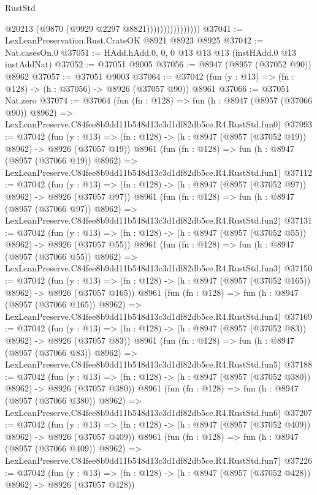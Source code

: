 \begin{lexlean}{RustStd}
\begin{coremodule}
                                @20213
                                (@9870 (@9929 @2297 @8821))))))))))))))))
@37041 := LexLeanPreservation.Rust.CrateOK @8921 @8923 @8925
@37042 := Nat.casesOn.{0}
@37051 := HAdd.hAdd.{0, 0, 0} @13 @13 @13 (instHAdd.{0} @13 instAddNat)
@37052 := @37051 @9005
@37056 := @8947 (@8957 (@37052 @90)) @8962
@37057 := @37051 @9003
@37064 := @37042 (fun (y : @13) => (fn : @128) -> (h : @37056) -> @8926 (@37057 @90)) @8961
@37066 := @37051 Nat.zero
@37074 := @37064
    (fun (fn : @128) =>
    fun (h : @8947 (@8957 (@37066 @90)) @8962) =>
    LexLeanPreserve.C84fee8b9dd11b548d13c3d1df82db5ce.R4.RustStd.fun0)
@37093 := @37042
    (fun (y : @13) => (fn : @128) -> (h : @8947 (@8957 (@37052 @19)) @8962) -> @8926 (@37057 @19))
    @8961
    (fun (fn : @128) =>
    fun (h : @8947 (@8957 (@37066 @19)) @8962) =>
    LexLeanPreserve.C84fee8b9dd11b548d13c3d1df82db5ce.R4.RustStd.fun1)
@37112 := @37042
    (fun (y : @13) => (fn : @128) -> (h : @8947 (@8957 (@37052 @97)) @8962) -> @8926 (@37057 @97))
    @8961
    (fun (fn : @128) =>
    fun (h : @8947 (@8957 (@37066 @97)) @8962) =>
    LexLeanPreserve.C84fee8b9dd11b548d13c3d1df82db5ce.R4.RustStd.fun2)
@37131 := @37042
    (fun (y : @13) => (fn : @128) -> (h : @8947 (@8957 (@37052 @55)) @8962) -> @8926 (@37057 @55))
    @8961
    (fun (fn : @128) =>
    fun (h : @8947 (@8957 (@37066 @55)) @8962) =>
    LexLeanPreserve.C84fee8b9dd11b548d13c3d1df82db5ce.R4.RustStd.fun3)
@37150 := @37042
    (fun (y : @13) => (fn : @128) -> (h : @8947 (@8957 (@37052 @165)) @8962) -> @8926 (@37057 @165))
    @8961
    (fun (fn : @128) =>
    fun (h : @8947 (@8957 (@37066 @165)) @8962) =>
    LexLeanPreserve.C84fee8b9dd11b548d13c3d1df82db5ce.R4.RustStd.fun4)
@37169 := @37042
    (fun (y : @13) => (fn : @128) -> (h : @8947 (@8957 (@37052 @83)) @8962) -> @8926 (@37057 @83))
    @8961
    (fun (fn : @128) =>
    fun (h : @8947 (@8957 (@37066 @83)) @8962) =>
    LexLeanPreserve.C84fee8b9dd11b548d13c3d1df82db5ce.R4.RustStd.fun5)
@37188 := @37042
    (fun (y : @13) => (fn : @128) -> (h : @8947 (@8957 (@37052 @380)) @8962) -> @8926 (@37057 @380))
    @8961
    (fun (fn : @128) =>
    fun (h : @8947 (@8957 (@37066 @380)) @8962) =>
    LexLeanPreserve.C84fee8b9dd11b548d13c3d1df82db5ce.R4.RustStd.fun6)
@37207 := @37042
    (fun (y : @13) => (fn : @128) -> (h : @8947 (@8957 (@37052 @409)) @8962) -> @8926 (@37057 @409))
    @8961
    (fun (fn : @128) =>
    fun (h : @8947 (@8957 (@37066 @409)) @8962) =>
    LexLeanPreserve.C84fee8b9dd11b548d13c3d1df82db5ce.R4.RustStd.fun7)
@37226 := @37042
    (fun (y : @13) => (fn : @128) -> (h : @8947 (@8957 (@37052 @428)) @8962) -> @8926 (@37057 @428))

\end{coremodule}
\end{lexlean}

